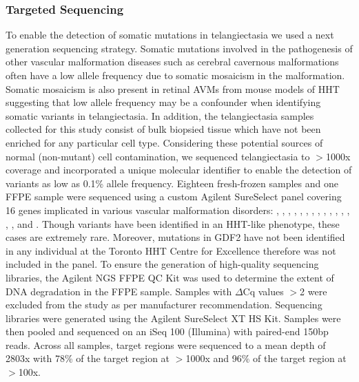 \subsubsection{Targeted Sequencing}
To enable the detection of somatic mutations in telangiectasia we used a next generation sequencing strategy. Somatic mutations involved in the pathogenesis of other vascular malformation diseases such as cerebral cavernous malformations often have a low allele frequency due to somatic mosaicism in the malformation. Somatic mosaicism is also present in retinal AVMs from mouse models of HHT suggesting that low allele frequency may be a confounder when identifying somatic variants in telangiectasia. In addition, the telangiectasia samples collected for this study consist of bulk biopsied tissue which have not been enriched for any particular cell type. Considering these potential sources of normal (non-mutant) cell contamination, we sequenced telangiectasia to $>$1000x coverage and incorporated a unique molecular identifier to enable the detection of variants as low as 0.1\% allele frequency.
Eighteen fresh-frozen samples and one FFPE sample were sequenced using a custom Agilent SureSelect panel covering 16 genes implicated in various vascular malformation disorders: , , , , , , , , , , , , , , , and . Though  variants have been identified in an HHT-like phenotype, these cases are extremely rare. Moreover, mutations in GDF2 have not been identified in any individual at the Toronto HHT Centre for Excellence therefore  was not included in the panel. To ensure the generation of high-quality sequencing libraries, the Agilent NGS FFPE QC Kit was used to determine the extent of DNA degradation in the FFPE sample. Samples with $\Delta$Cq values $>$2 were excluded from the study as per manufacturer recommendation. Sequencing libraries were generated using the Agilent SureSelect XT HS Kit. Samples were then pooled and sequenced on an iSeq 100 (Illumina) with paired-end 150bp reads. Across all samples, target regions were sequenced to a mean depth of 2803x with 78\% of the target region at $>$1000x and 96\% of the target region at $>$100x. 

